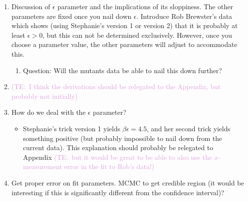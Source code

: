 \documentclass[10pt,letterpaper]{article}
\newcommand{\talComment}[1]{\textcolor{Plum}{(TE:~#1)}}
\begin{document}
\begin{enumerate}
	\item Discussion of $\epsilon$ parameter and the implications of its sloppiness. The other parameters are fixed once you nail down $\epsilon$. Introduce Rob Brewster's data  which shows (using Stephanie's version 1 or version 2) that it is probably at least $\epsilon > 0$, but this can not be determined exclusively. However, once you choose a parameter value, the other parameters will adjust to accommodate this.
	\begin{enumerate}
		\item Question: Will the mutants data be able to nail this down further?
	\end{enumerate}
	
	\item \talComment{I think the derivations should be relegated to the Appendix, but probably not initially}
	
	\item How do we deal with the $\epsilon$ parameter?
	\begin{itemize}
		\item Stephanie's trick version 1 yields $\beta \epsilon = 4.5$, and her second trick yields something positive (but probably impossible to nail down from the current data). This explanation should probably be relegated to Appendix \talComment{but it would be great to be able to also use the $x$-measurement error in the fit to Rob's data!}
	\end{itemize}
	
	\item Get proper error on fit parameters. MCMC to get credible region (it would be interesting if this is significantly different from the confidence interval)?
\end{enumerate}

\nolinenumbers



\end{document}
